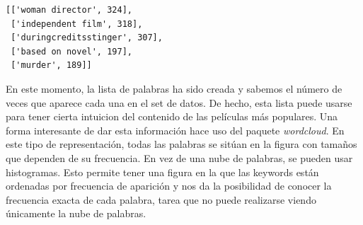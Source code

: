             \begin{tcolorbox}[breakable, boxrule=.5pt, size=fbox, pad at break*=1mm, opacityfill=0]
\begin{Verbatim}[commandchars=\\\{\}]
[['woman director', 324],
 ['independent film', 318],
 ['duringcreditsstinger', 307],
 ['based on novel', 197],
 ['murder', 189]]
\end{Verbatim}
\end{tcolorbox}
        
    En este momento, la lista de palabras ha sido creada y sabemos el número
de veces que aparece cada una en el set de datos. De hecho, esta lista
puede usarse para tener cierta intuicion del contenido de las películas
más populares. Una forma interesante de dar esta información hace uso
del paquete \emph{wordcloud}. En este tipo de representación, todas las
palabras se sitúan en la figura con tamaños que dependen de su
frecuencia. En vez de una nube de palabras, se pueden usar histogramas.
Esto permite tener una figura en la que las keywords están ordenadas por
frecuencia de aparición y nos da la posibilidad de conocer la frecuencia
exacta de cada palabra, tarea que no puede realizarse viendo únicamente
la nube de palabras.

